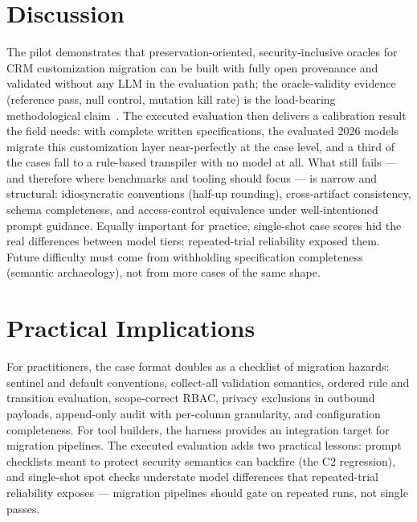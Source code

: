 \documentclass[journal]{IEEEtran}
\begin{document}
\section{Discussion}
\label{sec:discussion}
The pilot demonstrates that preservation-oriented, security-inclusive oracles for CRM
customization migration can be built with fully open provenance and validated without any
LLM in the evaluation path; the oracle-validity evidence (reference pass, null control,
mutation kill rate) is the load-bearing methodological claim~\cite{liu2023evalplus,
zhu2025rigorous}. The executed evaluation then delivers a calibration result the field needs:
with complete written specifications, the evaluated 2026 models migrate this customization
layer near-perfectly at the case level, and a third of the cases fall to a rule-based
transpiler with no model at all. What still fails --- and therefore where benchmarks and tooling should
focus --- is narrow and structural: idiosyncratic conventions (half-up rounding),
cross-artifact consistency, schema completeness, and access-control equivalence under
well-intentioned prompt guidance. Equally important for practice, single-shot case scores hid
the real differences between model tiers; repeated-trial reliability exposed them. Future
difficulty must come from withholding specification completeness (semantic archaeology), not
from more cases of the same shape.

\section{Practical Implications}
\label{sec:implications}
For practitioners, the case format doubles as a checklist of migration hazards: sentinel and
default conventions, collect-all validation semantics, ordered rule and transition evaluation,
scope-correct RBAC, privacy exclusions in outbound payloads, append-only audit with per-column
granularity, and configuration completeness. For tool builders, the harness provides an
integration target for migration pipelines. The executed evaluation adds two practical
lessons: prompt checklists meant to protect security semantics can backfire (the C2
regression), and single-shot spot checks understate model differences that repeated-trial
reliability exposes --- migration pipelines should gate on repeated runs, not single passes.
\end{document}
